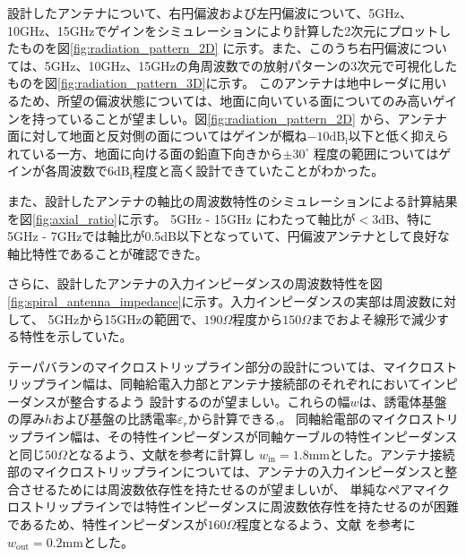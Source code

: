 \documentclass[11pt,a4paper,uplatex,draft]{ujarticle}
\begin{document}
  設計したアンテナについて、右円偏波および左円偏波について、5GHz、10GHz、15GHzでゲインをシミュレーションにより計算した2次元にプロットしたものを図\ref{fig:radiation_pattern_2D}
  に示す。また、このうち右円偏波については、5GHz、10GHz、15GHzの角周波数での放射パターンの3次元で可視化したものを図\ref{fig:radiation_pattern_3D}に示す。
  このアンテナは地中レーダに用いるため、所望の偏波状態については、地面に向いている面についてのみ高いゲインを持っていることが望ましい。図\ref{fig:radiation_pattern_2D}
  から、アンテナ面に対して地面と反対側の面についてはゲインが概ね$-10\mathrm{dB_i}$以下と低く抑えられている一方、地面に向ける面の鉛直下向きから$\displaystyle \pm 30^{\circ}$
  程度の範囲についてはゲインが各周波数で$6\mathrm{dB_i}$程度と高く設計できていたことがわかった。

  また、設計したアンテナの軸比の周波数特性のシミュレーションによる計算結果を図\ref{fig:axial_ratio}に示す。
  5GHz - 15GHz にわたって軸比が$<3\mathrm{dB}$、特に5GHz - 7GHzでは軸比が0.5dB以下となっていて、円偏波アンテナとして良好な軸比特性であることが確認できた。

  さらに、設計したアンテナの入力インピーダンスの周波数特性を図\ref{fig:spiral_antenna_impedance}に示す。入力インピーダンスの実部は周波数に対して、
  5GHzから15GHzの範囲で、$190\Omega$程度から$150\Omega$までおよそ線形で減少する特性を示していた。

  テーパバランのマイクロストリップライン部分の設計については、マイクロストリップライン幅は、同軸給電入力部とアンテナ接続部のそれぞれにおいてインピーダンスが整合するよう
  設計するのが望ましい。これらの幅$w$は、誘電体基盤の厚み$h$および基盤の比誘電率$\varepsilon_r$から計算できる\cite{ground_microstrip_line},\cite{pair_microstrip_line}。
  同軸給電部のマイクロストリップライン幅は、その特性インピーダンスが同軸ケーブルの特性インピーダンスと同じ$50\Omega$となるよう、文献\cite{ground_microstrip_line}を参考に計算し
  $w_{\mathrm{in}} = 1.8\mathrm{mm}$とした。アンテナ接続部のマイクロストリップラインについては、アンテナの入力インピーダンスと整合させるためには周波数依存性を持たせるのが望ましいが、
  単純なペアマイクロストリップラインでは特性インピーダンスに周波数依存性を持たせるのが困難であるため、特性インピーダンスが$160\Omega$程度となるよう、文献\cite{pair_microstrip_line}
  を参考に$w_{\mathrm{out}} = 0.2\mathrm{mm}$とした。
\end{document}
